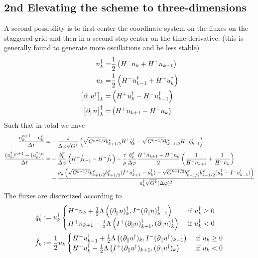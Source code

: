 \subsection{2nd Elevating the scheme to three-dimensions}
A second possibility is to first center the coordinate system on the fluxes on the staggered grid and then
in a second step center on the time-derivative: (this is generally found to generate more oscillations and
be less stable)
\begin{align}
n_k^\dagger =& \frac{1}{2}\left( H^- n_k + H^+ n_{k+1}\right) \\
u_k =& \frac{1}{2}\left( H^- u^\dagger_{k-1} + H^+ u_{k}^\dagger\right)\\
\left[\partial_\parallel u^\dagger \right]_k =& \left( H^+ u^\dagger_{k} - H^-
u^\dagger_{k-1}\right) \\
\left[\partial_\parallel n\right]^\dagger_k =& \left( H^+ n_{k+1} - H^-
n_k\right)
\end{align}
Such that in total we have
\begin{align}
    \frac{n_k^{n+1} - n_k^n}{\Delta t} = &-\frac{1}{\Delta\varphi \sqrt{G^k}}
    \left( \sqrt{G^{k+1/2}}b^\varphi_{k+1/2}  H^+ \hat q_{k}^\dagger
    -\sqrt{G^{k-1/2}}b^\varphi_{k-1/2}  H^- \hat q_{k-1}^\dagger \right)
     \\
    \frac{(u_k^\dagger)^{n+1}-(u_k^\dagger)^{n}}{\Delta t} = &-
 \frac{b^\varphi_k}{\Delta\varphi}\left( H^+\hat f_{k+1} - H^-\hat f_k\right)
 -\frac{\tau}{\mu}\frac{b^\varphi_k}{\Delta\varphi} \frac{H^+ n_{k+1} - H^- n_k}{2}\left( \frac{1}{H^+ n_{k+1}} + \frac{1}{H^- n_k} \right)
    \nonumber\\
    &+ \frac{\nu_u
        \left(\sqrt{G^{k+1/2}}b^\varphi_{k+1/2}b^\varphi_{k+1/2} (I^+ u^\dagger_{k+1} - u^\dagger_k)
        - \sqrt{G^{k-1/2}}b^\varphi_{k-1/2}b^\varphi_{k-1/2} ( u^\dagger_k - I^- u^\dagger_{k-1})\right)
    }{n^\dagger_{k} \sqrt{G^k}(\Delta \varphi)^2}
\end{align}
The fluxes are discretized according to
\begin{align}
    \hat q^\dagger_k &:= u^\dagger_k \begin{cases}
        H^- n_k     + \frac{1}{2}\Lambda\left( (\partial_\parallel n)^\dagger_k, I^- (\partial_\parallel n)^\dagger_{k-1}\right)&\text{ if } u^\dagger_k \geq 0 \\
        H^+ n_{k+1} - \frac{1}{2}\Lambda\left( I^+(\partial_\parallel n)^\dagger_{k+1}, (\partial_\parallel n)^\dagger_k\right) &\text{ if } u^\dagger_k < 0
    \end{cases}
    \\
    \hat f_k &:= \frac{1}{2}u_k\begin{cases}
        H^- u^\dagger_{k-1} + \frac{1}{2}\Lambda\left( (\partial_\parallel u^\dagger )_k, I^- (\partial_\parallel u^\dagger)_{k-1}\right)&\text{ if } u_k \geq 0 \\
        H^+ u^\dagger_{k}   - \frac{1}{2}\Lambda\left( I^+(\partial_\parallel u^\dagger)_{k+1}, (\partial_\parallel u^\dagger)_k\right) &\text{ if } u_k < 0 \\
    \end{cases}
\end{align}




